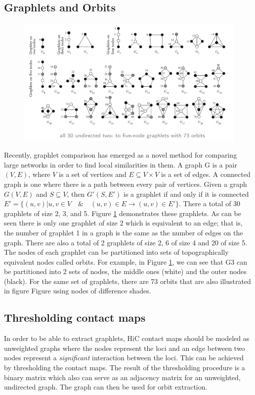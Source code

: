 \documentclass[a4,center,fleqn]{NAR}
\begin{document}
\subsection{Graphlets and Orbits}
\begin{figure}[H]
    \centering
    \includegraphics[width=.5\textwidth]{figures/graphlets.png}
    \caption{}
    \label{fig_graphlets}
\end{figure}
Recently, graphlet comparison has emerged as
a novel method for comparing large networks in
order to find local similarities in them. A
graph G is a pair $(V,E)$, where $V$ is a set of
vertices and $E \subseteq V\times V$ is a set of
edges. A connected graph is one where there is
a path between every pair of vertices.
Given a graph $G(V, E)$ and $S \subseteq V$,
then $G'(S, E')$ is a graphlet if and only if
it is connected $E' = \{(u, v) | u, v \in V \quad \&
\quad (u, v) \in E \rightarrow (u, v) \in E'\}$. 
There a total of 30 graphlets
of size 2, 3, and 5.  Figure \ref{fig_graphlets}
demonstrates these graphlets. 
As can be seen there is only one graphlet
of size 2 which is equivalent to an edge; that
is, the number of graphlet 1 in a graph is the
same as the number of edges on the graph. There
are also a total of 2 graphlets of size 2, 6
of size 4 and 20 of size 5. The nodes of each graphlet
can be partitioned into sets of topographically equivalent
nodes called orbits. For  example, in  Figure 
\ref{fig_graphlets}, we can see that G3 can be
partitioned into 2 sets of nodes, the middle ones
(white) and the outer nodes (black). 
For the same set of graphlets,
there are 73 orbits that are also illustrated in
figure  Figure using nodes of difference shades.

\subsection{Thresholding contact maps}
In order to be able to extract graphlets, HiC contact maps should be modeled as
unweighted graphs where the nodes represent the loci and an edge between two 
nodes represent a \textit{significant} interaction between the loci.
This can be achieved by thresholding the contact maps. The result
of the thresholding procedure is a binary matrix which also can serve as
an adjacency matrix for an unweighted, undirected graph. The graph can then be
used for orbit extraction.
\end{document}
